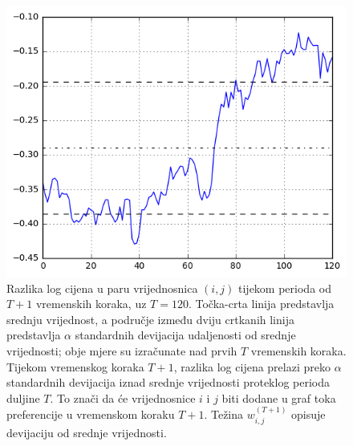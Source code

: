 \documentclass[lmodern, utf8, diplomski, numeric]{fer}
\begin{document}
  \begin{figure}[htb]
    \centering
    \includegraphics[width=0.9\columnwidth]{graphics/deviation-magnitude.png}
    \caption{
       Razlika log cijena u paru vrijednosnica $(i,j)$ tijekom perioda od $T + 1$ vremenskih koraka, uz $T = 120$.
       Točka-crta linija predstavlja srednju vrijednost, a područje između dviju crtkanih linija predstavlja $\alpha$ standardnih devijacija udaljenosti od srednje vrijednosti; obje mjere su izračunate nad prvih $T$ vremenskih koraka.
       Tijekom vremenskog koraka $T + 1$, razlika log cijena prelazi preko $\alpha$ standardnih devijacija iznad srednje vrijednosti proteklog perioda duljine $T$.
       To znači da će vrijednosnice $i$ i $j$ biti dodane u graf toka preferencije u vremenskom koraku $T + 1$.
       Težina $w_{i,j}^{(T+1)}$ opisuje devijaciju od srednje vrijednosti.
    }
    \label{fig:devmag}
  \end{figure}
  
\end{document}
